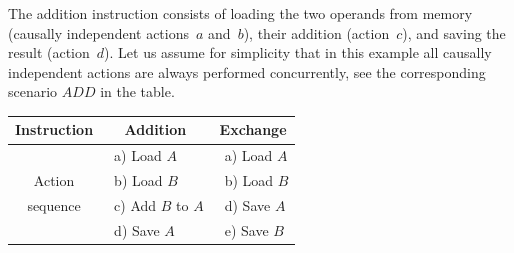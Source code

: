 The addition instruction consists of loading the two operands from
memory (causally independent actions~$a$ and~$b$), their addition
(action~$c$), and saving the result (action~$d$). Let us assume
for simplicity that in this example all causally independent actions
are always performed concurrently, see the corresponding scenario
$\mathit{ADD}$ in the table.

\begin{table}
\begin{centering}
\begin{tabular}{|c||c||c|c|}
\hline 
\multicolumn{2}{|c||}{Instruction} & Addition & Exchange\tabularnewline
\hline 
\multicolumn{2}{|c||}{} & \multicolumn{1}{l|}{~a) Load $A$} & \multicolumn{1}{l|}{~a) Load $A$}\tabularnewline
\multicolumn{2}{|c||}{Action} & \multicolumn{1}{l|}{~b) Load $B$} & \multicolumn{1}{l|}{~b) Load $B$}\tabularnewline
\multicolumn{2}{|c||}{sequence} & \multicolumn{1}{l|}{~c) Add $B$ to $A$} & \multicolumn{1}{l|}{~d) Save $A$}\tabularnewline
\multicolumn{2}{|c||}{} & \multicolumn{1}{l|}{~d) Save $A$} & \multicolumn{1}{l|}{~e) Save $B$}\tabularnewline
\hline 

\end{tabular}
\end{centering}
\end{table}
